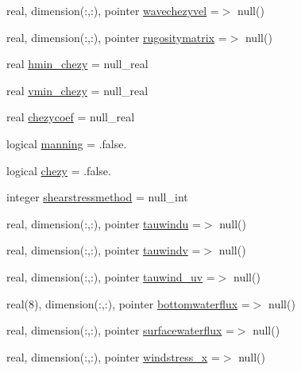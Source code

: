 \begin{DoxyCompactItemize}
\item 
real, dimension(\+:,\+:), pointer \mbox{\hyperlink{structmodulehydrodynamic_1_1t__external_a6d3321394e3f6c64d08826ea5f584eaa}{wavechezyvel}} =$>$ null()
\item 
real, dimension(\+:,\+:), pointer \mbox{\hyperlink{structmodulehydrodynamic_1_1t__external_a5f6d6b6a8118ade6d13a08a64729964a}{rugositymatrix}} =$>$ null()
\item 
real \mbox{\hyperlink{structmodulehydrodynamic_1_1t__external_a0f2d2a334980fac313a57fce94c94441}{hmin\+\_\+chezy}} = null\+\_\+real
\item 
real \mbox{\hyperlink{structmodulehydrodynamic_1_1t__external_a09e984e44ca53f457b77b792cb3fc1d5}{vmin\+\_\+chezy}} = null\+\_\+real
\item 
real \mbox{\hyperlink{structmodulehydrodynamic_1_1t__external_a6422f8ac50cd3c405353f5c7c50d8a4f}{chezycoef}} = null\+\_\+real
\item 
logical \mbox{\hyperlink{structmodulehydrodynamic_1_1t__external_adbe8254671536aac63f2024b92eeb3ee}{manning}} = .false.
\item 
logical \mbox{\hyperlink{structmodulehydrodynamic_1_1t__external_aef9fa6caf24eee25b581245d483f9c84}{chezy}} = .false.
\item 
integer \mbox{\hyperlink{structmodulehydrodynamic_1_1t__external_afea73a985ffdbac1004129baf6a8583e}{shearstressmethod}} = null\+\_\+int
\item 
real, dimension(\+:,\+:), pointer \mbox{\hyperlink{structmodulehydrodynamic_1_1t__external_ab2c33a4fc31004542704749c969872a4}{tauwindu}} =$>$ null()
\item 
real, dimension(\+:,\+:), pointer \mbox{\hyperlink{structmodulehydrodynamic_1_1t__external_aed754a8ceb7e11bf58cc04911c99c20d}{tauwindv}} =$>$ null()
\item 
real, dimension(\+:,\+:), pointer \mbox{\hyperlink{structmodulehydrodynamic_1_1t__external_a8e200e22026b823851eb6566c25d8976}{tauwind\+\_\+uv}} =$>$ null()
\item 
real(8), dimension(\+:,\+:), pointer \mbox{\hyperlink{structmodulehydrodynamic_1_1t__external_a6bcff60bd66f41a3745016282ea6aefc}{bottomwaterflux}} =$>$ null()
\item 
real, dimension(\+:,\+:), pointer \mbox{\hyperlink{structmodulehydrodynamic_1_1t__external_abc59195f46ea07b1dc7cadafbfb8f9c9}{surfacewaterflux}} =$>$ null()
\item 
real, dimension(\+:,\+:), pointer \mbox{\hyperlink{structmodulehydrodynamic_1_1t__external_a6f7cbeab5a90d3566811938eb17a8ae0}{windstress\+\_\+x}} =$>$ null()

\end{DoxyCompactItemize}
